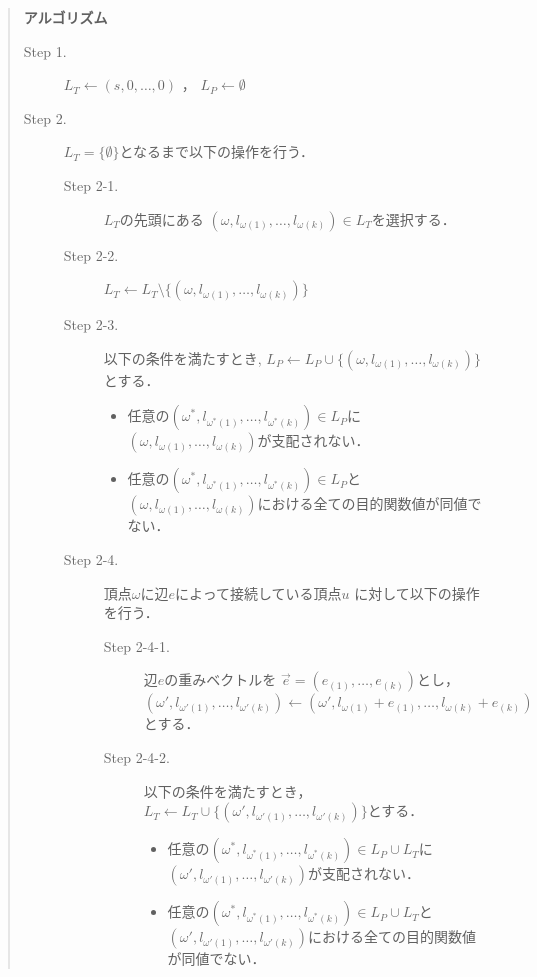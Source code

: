\documentclass[12pt]{optlab-bachelor}
\begin{document}
\begin{quote}
  \textbf{アルゴリズム}
  \begin{description}
    \item[Step 1.] $L_T \leftarrow (s,0,\ldots,0)$ ，
    $L_P \leftarrow \emptyset$
    \item[Step 2.] $L_T = \{\emptyset\}$となるまで以下の操作を行う．
    \begin{description}
      \item[Step 2-1.] $L_T$の先頭にある
      $(\omega,l_{\omega(1)},\ldots,l_{\omega(k)})\in L_T$を選択する．
      \item[Step 2-2.] $L_T \leftarrow L_T \setminus
      \{ (\omega,l_{\omega(1)},\ldots,l_{\omega(k)}) \}$
      \item[Step 2-3.] 以下の条件を満たすとき,
      $L_P \leftarrow L_P \cup \{(\omega,l_{\omega(1)},\ldots,l_{\omega(k)})\}$とする．
      \begin{itemize}
        \item 任意の$(\omega^*,l_{\omega^*(1)},\ldots,l_{\omega^*(k)})\in L_P$に
        $(\omega,l_{\omega(1)},\ldots,l_{\omega(k)})$が支配されない．
        \item 任意の$(\omega^*,l_{\omega^*(1)},\ldots,l_{\omega^*(k)}) \in L_P$と
        $(\omega,l_{\omega(1)},\ldots,l_{\omega(k)})$における全ての目的関数値が同値でない．
      \end{itemize}
      \item[Step 2-4.] 頂点$\omega$に辺$e$によって接続している頂点$u$
      に対して以下の操作を行う．
      \begin{description}
        \item[Step 2-4-1.] 辺$e$の重みベクトルを
        $\vec{e} = (e_{(1)},\ldots,e_{(k)})$とし，
        $(\omega',l_{\omega'(1)},\ldots,l_{\omega'(k)}) \leftarrow
        (\omega',l_{\omega(1)}+e_{(1)},\ldots,l_{\omega(k)}+e_{(k)})$とする．
        \item[Step 2-4-2.] 以下の条件を満たすとき，
        $L_T \leftarrow L_T \cup \{(\omega',l_{\omega'(1)},\ldots,l_{\omega'(k)})\}$とする．
        \begin{itemize}
          \item 任意の$(\omega^*,l_{\omega^*(1)},\ldots,l_{\omega^*(k)})\in L_P \cup L_T$に
          $(\omega',l_{\omega'(1)},\ldots,l_{\omega'(k)})$が支配されない．
          \item 任意の$(\omega^*,l_{\omega^*(1)},\ldots,l_{\omega^*(k)}) \in L_P \cup L_T$と
          $(\omega',l_{\omega'(1)},\ldots,l_{\omega'(k)})$における全ての目的関数値が同値でない．

\end{itemize}
\end{description}
\end{description}
\end{description}
\end{quote}
\end{document}
